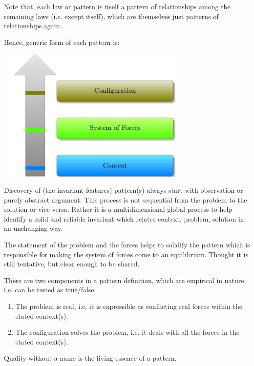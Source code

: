 Note that, each law or pattern is itself a pattern of relationships among the remaining laws (i.e. except itself), which are themselves just patterns of relationships again.


\vspace{3mm}

Hence, generic form of each pattern is:

  \begin{center}
    \includegraphics[width=0.7\textwidth]{designpatterns/patterns-form}
  \end{center}

Discovery of (the invariant features) pattern(s) always start with observation or purely abstract argument. This process is not sequential from the problem to the solution or vice versa. Rather it is a multidimensional global process to help identify a solid and reliable invariant which relates context, problem, solution in an unchanging way. 

The statement of the problem and the forces helps to solidify the pattern which is responsible for making the system of forces come to an equilibrium. Thought it is still tentative, but clear enough to be shared.

There are two components in a pattern definition, which are empirical in nature, i.e. can be tested as true/false:
\begin{enumerate}
\item The problem is real, i.e. it is expressible as conflicting real forces within the stated context(s).
\item The configuration solves the problem, i.e. it deals with all the forces in the stated context(s).
\end{enumerate}
Quality without a name is the living essence of a pattern.

